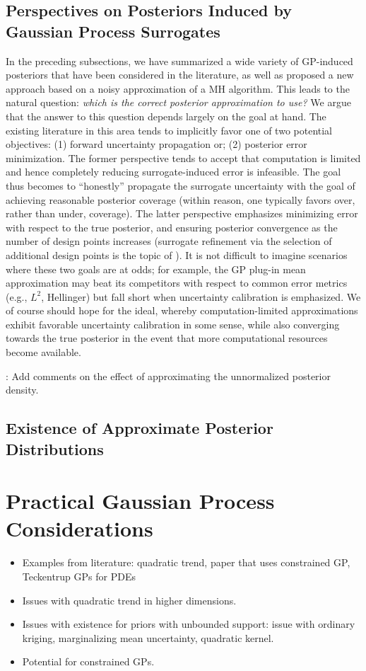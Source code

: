 \documentclass[12pt]{article}
\begin{document}
\subsection{Perspectives on Posteriors Induced by Gaussian Process Surrogates}
In the preceding subsections, we have summarized a wide variety of GP-induced posteriors that have been considered 
in the literature, as well as proposed a new approach based on a noisy approximation of a MH algorithm. This leads to 
the natural question: \textit{which is the correct posterior approximation to use?} We argue that the answer to this question 
depends largely on the goal at hand. The existing literature in this area tends to implicitly favor one of two potential 
objectives: (1) forward uncertainty propagation or; (2) posterior error minimization. The former perspective tends to 
accept that computation is limited and hence completely reducing surrogate-induced error is infeasible. The goal thus 
becomes to ``honestly'' propagate the surrogate uncertainty with the goal of achieving reasonable posterior coverage 
(within reason, one typically favors over, rather than under, coverage). The latter perspective emphasizes minimizing 
error with respect to the true posterior, and ensuring posterior convergence as the number of design points increases
(surrogate refinement via the selection of additional design points is the topic of  ). It is not difficult to 
imagine scenarios where these two goals are at odds; for example, the GP plug-in mean approximation may beat its
competitors with respect to common error metrics (e.g., $L^2$, Hellinger) but fall short when uncertainty calibration 
is emphasized. We of course should hope for the ideal, whereby computation-limited approximations exhibit favorable 
uncertainty calibration in some sense, while also converging towards the true posterior in the event that more 
computational resources become available.    

\todo: Add comments on the effect of approximating the unnormalized posterior density. 


\subsection{Existence of Approximate Posterior Distributions} \label{post_existence}
\todo

\section{Practical Gaussian Process Considerations}
\begin{itemize}
\item Examples from literature: quadratic trend, paper that uses constrained GP, Teckentrup GPs for PDEs
\item Issues with quadratic trend in higher dimensions. 
\item Issues with existence for priors with unbounded support: issue with ordinary kriging, marginalizing mean 
uncertainty, quadratic kernel. 
\item Potential for constrained GPs.
\end{itemize}
\end{document}
